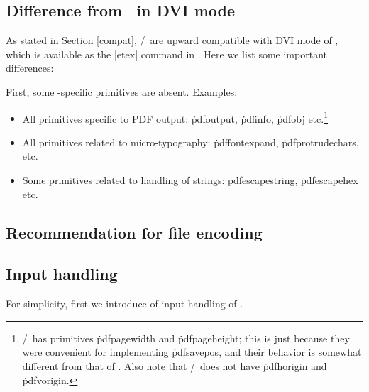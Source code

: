 \documentclass[a4paper,11pt,dvipdfmx]{article}
\let\emph=\origemph
\begin{document}
\subsection{Difference from \pdfTeX\ in DVI mode}\label{dvi-pdftex}

As stated in Section \ref{compat}, \epTeX/\eupTeX\ are
\emph{not} upward compatible with DVI mode of \pdfTeX,
which is available as the |etex| command in \TL.
Here we list some important differences:

First, some \pdfTeX-specific primitives are absent. Examples:
\begin{itemize}
 \item All primitives specific to PDF output:
   \.{pdfoutput}, \.{pdfinfo}, \.{pdfobj} etc.\footnote{%
    \epTeX/\eupTeX\ has primitives \.{pdfpagewidth} and \.{pdfpageheight};
    this is just because they were convenient for implementing \.{pdfsavepos},
    and their behavior is somewhat different from that of \pdfTeX.
    Also note that \epTeX/\eupTeX\ does not have \.{pdfhorigin}
    and \.{pdfvorigin}.}
 \item All primitives related to micro-typography:
   \.{pdffontexpand}, \.{pdfprotrudechars}, etc.
 \item Some primitives related to handling of strings:
   \.{pdfescapestring}, \.{pdfescapehex} etc.
\end{itemize}



\subsection{Recommendation for file encoding}


\subsection{Input handling}

For simplicity, first we introduce of input handling of \eupTeX.

\end{document}
